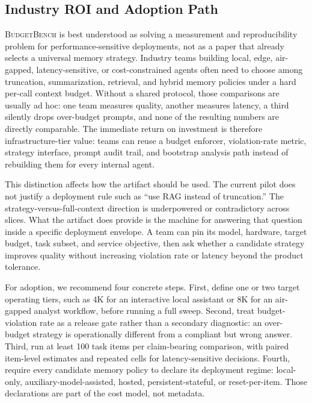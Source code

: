 \documentclass[11pt]{article}
\newcommand{\BudgetBench}{\textsc{BudgetBench}}
\begin{document}
\subsection{Industry ROI and Adoption Path}

\BudgetBench{} is best understood as solving a measurement and reproducibility
problem for performance-sensitive deployments, not as a paper that already
selects a universal memory strategy.  Industry teams building local, edge,
air-gapped, latency-sensitive, or cost-constrained agents often need to choose
among truncation, summarization, retrieval, and hybrid memory policies under a
hard per-call context budget.  Without a shared protocol, those comparisons are
usually ad hoc: one team measures quality, another measures latency, a third
silently drops over-budget prompts, and none of the resulting numbers are
directly comparable.  The immediate return on investment is therefore
infrastructure-tier value: teams can reuse a budget enforcer, violation-rate
metric, strategy interface, prompt audit trail, and bootstrap analysis path
instead of rebuilding them for every internal agent.

This distinction affects how the artifact should be used.  The current pilot
does not justify a deployment rule such as ``use RAG instead of truncation.''
The strategy-versus-full-context direction is underpowered or contradictory
across slices.  What the artifact does provide is the machine for answering
that question inside a specific deployment envelope.  A team can pin its model,
hardware, target budget, task subset, and service objective, then ask whether a
candidate strategy improves quality without increasing violation rate or
latency beyond the product tolerance.

For adoption, we recommend four concrete steps.  First, define one or two
target operating tiers, such as 4K for an interactive local assistant or 8K for
an air-gapped analyst workflow, before running a full sweep.  Second, treat
budget-violation rate as a release gate rather than a secondary diagnostic:
an over-budget strategy is operationally different from a compliant but wrong
answer.  Third, run at least 100 task items per claim-bearing comparison, with
paired item-level estimates and repeated cells for latency-sensitive decisions.
Fourth, require every candidate memory policy to declare its deployment regime:
local-only, auxiliary-model-assisted, hosted, persistent-stateful, or
reset-per-item.  Those declarations are part of the cost model, not metadata.
\end{document}
